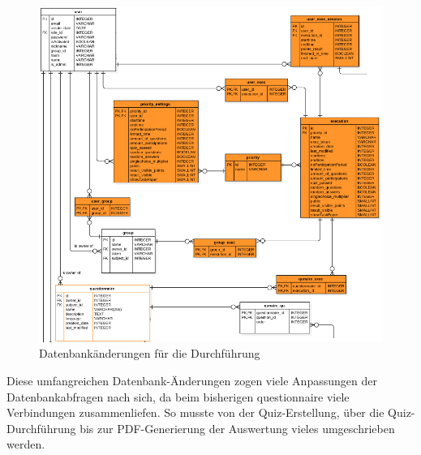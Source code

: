 \begin{itemize}
	\begin{figure}[H]
		\centering
		\includegraphics[width=1\textwidth
		]{Images/DB_Execution_Table.PNG}
		\caption{Datenbankänderungen für die Durchführung}
	\end{figure}
	
\end{itemize}

Diese umfangreichen Datenbank-Änderungen zogen viele Anpassungen der Datenbankabfragen nach sich, da beim bisherigen questionnaire viele Verbindungen zusammenliefen. So musste von der Quiz-Erstellung, über die Quiz-Durchführung bis zur PDF-Generierung der Auswertung vieles umgeschrieben werden.
